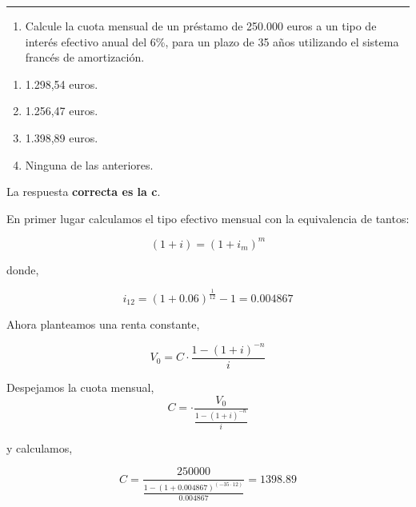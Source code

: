 \documentclass[
  letterpaper,
  DIV=11,
  numbers=noendperiod]{scrreprt}
\providecommand{\tightlist}{%
  \setlength{\itemsep}{0pt}\setlength{\parskip}{0pt}}\usepackage{longtable,booktabs,array}
\begin{document}
\begin{center}\rule{0.5\linewidth}{0.5pt}\end{center}

\begin{enumerate}
\def\labelenumi{\arabic{enumi}.}
\setcounter{enumi}{92}
\tightlist
\item
  Calcule la cuota mensual de un préstamo de 250.000 euros a un tipo de
  interés efectivo anual del 6\%, para un plazo de 35 años utilizando el
  sistema francés de amortización.
\end{enumerate}

\begin{enumerate}
\def\labelenumi{\alph{enumi}.}
\item
  1.298,54 euros.
\item
  1.256,47 euros.
\item
  1.398,89 euros.
\item
  Ninguna de las anteriores.
\end{enumerate}

\begin{tcolorbox}[enhanced jigsaw, left=2mm, opacityback=0, colback=white, breakable, arc=.35mm, bottomrule=.15mm, rightrule=.15mm, toprule=.15mm, leftrule=.75mm, colframe=quarto-callout-tip-color-frame]
\begin{minipage}[t]{5.5mm}
\textcolor{quarto-callout-tip-color}{\faLightbulb}
\end{minipage}%
\begin{minipage}[t]{\textwidth - 5.5mm}

La respuesta \textbf{correcta es la c}.

En primer lugar calculamos el tipo efectivo mensual con la equivalencia
de tantos:

\[(1+i)=(1+ i _m)^m\]

donde,

\[i_{12}=(1+0.06)^{\frac{1}{12}}-1=0.004867\]

Ahora planteamos una renta constante,

\[V_0=C\cdot\frac{1-\left(1+i\right)^{-n}}{i}\]

Despejamos la cuota mensual,
\[C=\cdot\frac{ V_0}{ \frac{1-\left(1+i\right)^{-n}}{i}}\]

y calculamos,

\[C=\frac{ 250000}{ \frac{1-\left(1+0.004867\right)^{(-35\cdot12)}}{0.004867}}=1398.89\]

\end{minipage}%
\end{tcolorbox}
\end{document}
